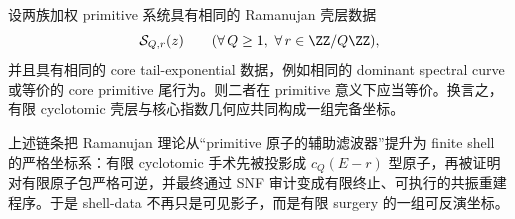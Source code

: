 \begin{conjecture}[壳--核全重建]\label{conj:conclusion-ramanujan-shell-core-complete-reconstruction}
设两族加权 primitive 系统具有相同的 Ramanujan 壳层数据
\[
\mathcal S_{Q,r}(z)
\qquad
(\forall\,Q\ge 1,\ \forall\,r\in \ZZ/Q\ZZ),
\]
并且具有相同的 core tail-exponential 数据，例如相同的 dominant spectral curve 或等价的 core primitive 尾行为。则二者在 primitive 意义下应当等价。换言之，有限 cyclotomic 壳层与核心指数几何应共同构成一组完备坐标。
\end{conjecture}

\noindent
上述链条把 Ramanujan 理论从“primitive 原子的辅助滤波器”提升为 finite shell 的严格坐标系：有限 cyclotomic 手术先被投影成 \(c_Q(E-r)\) 型原子，再被证明对有限原子包严格可逆，并最终通过 SNF 审计变成有限终止、可执行的共振重建程序。于是 shell-data 不再只是可见影子，而是有限 surgery 的一组可反演坐标。
